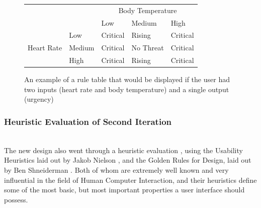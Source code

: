 \begin{figure}[ht!]
\begin{center}
\begin{tabular}{cl|lll}
\multicolumn{2}{c|}{} & \multicolumn{3}{c}{Body Temperature} \\
\multicolumn{2}{c|}{   }	& Low & Medium & High \\
\hline
\multirow{3}{10mm}{Heart Rate}	& Low		& Critical & Rising    & Critical \\
					& Medium	& Critical & No Threat & Critical \\
					& High		& Critical & Rising & Critical \\
\end{tabular}
\end{center}
\vspace{-4mm}
\caption{An example of a rule table that would be displayed if the user had two inputs (heart rate and body temperature) and a single output (urgency)}
\label{fig:ruleTable}
\end{figure}

\subsubsection{Heuristic Evaluation of Second Iteration}\ \\
The new design also went through a heuristic evaluation \cite{nielsen1990heuristic}, using the Usability Heuristics laid out by Jakob Nielson \cite{nielsen2005ten}, and the Golden Rules for Design, laid out by Ben Shneiderman \cite{shneiderman2005designing}. Both of whom are extremely well known and very influential in the field of Human Computer Interaction, and their heuristics define some of the most basic, but most important properties a user interface should possess. 

